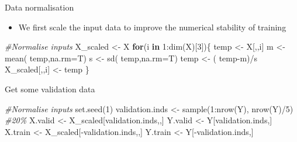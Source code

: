 \documentclass[
  ignorenonframetext,
]{beamer}
\newenvironment{Shaded}{\begin{snugshade}}{\end{snugshade}}
\newcommand{\AttributeTok}[1]{\textcolor[rgb]{0.77,0.63,0.00}{#1}}
\newcommand{\CommentTok}[1]{\textcolor[rgb]{0.56,0.35,0.01}{\textit{#1}}}
\newcommand{\ControlFlowTok}[1]{\textcolor[rgb]{0.13,0.29,0.53}{\textbf{#1}}}
\newcommand{\DecValTok}[1]{\textcolor[rgb]{0.00,0.00,0.81}{#1}}
\newcommand{\FunctionTok}[1]{\textcolor[rgb]{0.00,0.00,0.00}{#1}}
\newcommand{\NormalTok}[1]{#1}
\newcommand{\OtherTok}[1]{\textcolor[rgb]{0.56,0.35,0.01}{#1}}
\newcommand{\SpecialCharTok}[1]{\textcolor[rgb]{0.00,0.00,0.00}{#1}}
\providecommand{\tightlist}{%
  \setlength{\itemsep}{0pt}\setlength{\parskip}{0pt}}
\begin{document}
\begin{frame}[fragile]{Data normalisation}
\protect\hypertarget{data-normalisation}{}
\begin{itemize}
\tightlist
\item
  We first scale the input data to improve the numerical stability of
  training
\end{itemize}

\begin{Shaded}
\begin{Highlighting}[]
\CommentTok{\#Normalise inputs}
\NormalTok{X\_scaled }\OtherTok{\textless{}{-}}\NormalTok{ X}
\ControlFlowTok{for}\NormalTok{(i }\ControlFlowTok{in} \DecValTok{1}\SpecialCharTok{:}\FunctionTok{dim}\NormalTok{(X)[}\DecValTok{3}\NormalTok{])\{}
\NormalTok{  temp }\OtherTok{\textless{}{-}}\NormalTok{ X[,,i]}
\NormalTok{  m }\OtherTok{\textless{}{-}} \FunctionTok{mean}\NormalTok{( temp,}\AttributeTok{na.rm=}\NormalTok{T)}
\NormalTok{  s }\OtherTok{\textless{}{-}} \FunctionTok{sd}\NormalTok{( temp,}\AttributeTok{na.rm=}\NormalTok{T)}
\NormalTok{  temp }\OtherTok{\textless{}{-}}\NormalTok{ ( temp}\SpecialCharTok{{-}}\NormalTok{m)}\SpecialCharTok{/}\NormalTok{s}
\NormalTok{  X\_scaled[,,i] }\OtherTok{\textless{}{-}}\NormalTok{ temp}
\NormalTok{\}}
\end{Highlighting}
\end{Shaded}
\end{frame}

\begin{frame}[fragile]{Get some validation data}
\protect\hypertarget{get-some-validation-data}{}
\begin{Shaded}
\begin{Highlighting}[]
\CommentTok{\#Normalise inputs}
\FunctionTok{set.seed}\NormalTok{(}\DecValTok{1}\NormalTok{)}
\NormalTok{validation.inds }\OtherTok{\textless{}{-}} \FunctionTok{sample}\NormalTok{(}\DecValTok{1}\SpecialCharTok{:}\FunctionTok{nrow}\NormalTok{(Y), }\FunctionTok{nrow}\NormalTok{(Y)}\SpecialCharTok{/}\DecValTok{5}\NormalTok{) }\CommentTok{\#20\%}
\NormalTok{X.valid }\OtherTok{\textless{}{-}}\NormalTok{ X\_scaled[validation.inds,,]}
\NormalTok{Y.valid }\OtherTok{\textless{}{-}}\NormalTok{  Y[validation.inds,]}
\NormalTok{X.train }\OtherTok{\textless{}{-}}\NormalTok{ X\_scaled[}\SpecialCharTok{{-}}\NormalTok{validation.inds,,]}
\NormalTok{Y.train }\OtherTok{\textless{}{-}}\NormalTok{  Y[}\SpecialCharTok{{-}}\NormalTok{validation.inds,]}
\end{Highlighting}
\end{Shaded}
\end{frame}
\end{document}
